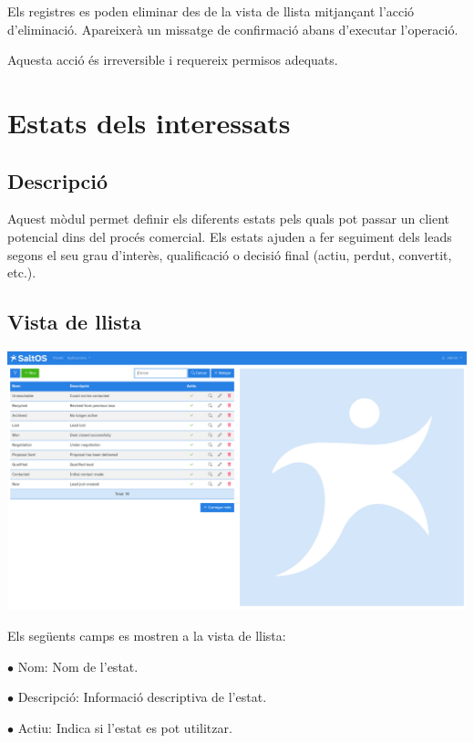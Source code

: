 \documentclass[a4paper]{article}
\begin{document}
Els registres es poden eliminar des de la vista de llista mitjançant l'acció d'eliminació.
Apareixerà un missatge de confirmació abans d'executar l'operació.

Aquesta acció és irreversible i requereix permisos adequats.


\hypertarget{toc61}{}
\section{Estats dels interessats}

\hypertarget{toc62}{}
\subsection{Descripció}

Aquest mòdul permet definir els diferents estats pels quals pot passar un client potencial dins del procés comercial.
Els estats ajuden a fer seguiment dels leads segons el seu grau d'interès, qualificació o decisió final (actiu, perdut, convertit, etc.).

\hypertarget{toc63}{}
\subsection{Vista de llista}

\begin{center}\includegraphics[width=1\textwidth]{../ujest/snaps/test-screenshots-js-screenshots-crm-leads-status-list-ca-es-1-snap.png}\end{center}

Els següents camps es mostren a la vista de llista:

\begin{compactitem}
\item[\color{myblue}$\bullet$] Nom: Nom de l'estat.
\item[\color{myblue}$\bullet$] Descripció: Informació descriptiva de l'estat.
\item[\color{myblue}$\bullet$] Actiu: Indica si l'estat es pot utilitzar.
\end{compactitem}
\end{document}
